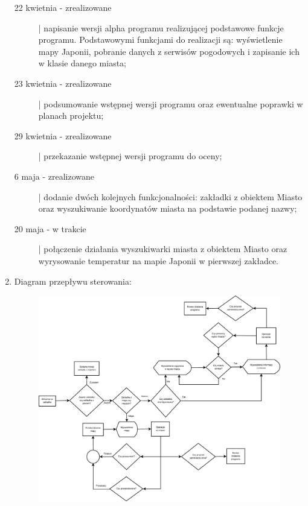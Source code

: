\documentclass[a4paper]{article}
\begin{document}
\begin{enumerate}
\begin{description}
\item[22 kwietnia - zrealizowane] | napisanie wersji alpha programu realizującej podstawowe funkcje programu. Podstawowymi funkcjami do realizacji są: wyświetlenie mapy Japonii, pobranie danych z serwisów pogodowych i zapisanie ich w klasie danego miasta;

\item[23 kwietnia - zrealizowane] | podsumowanie wstępnej wersji programu oraz ewentualne poprawki w planach projektu;

\item[29 kwietnia - zrealizowane] | przekazanie wstępnej wersji programu do oceny;

\item[6 maja - zrealizowane] | dodanie dwóch kolejnych funkcjonalności: zakładki z obiektem Miasto oraz wyszukiwanie koordynatów miasta na podstawie podanej nazwy;

\item[20 maja - w trakcie] | połączenie działania wyszukiwarki miasta z obiektem Miasto oraz wyrysowanie temperatur na mapie Japonii w pierwszej zakładce.
\end{description}

\pagebreak
\item Diagram przepływu sterowania:\\
\begin{figure}[H]
\includegraphics[width=15cm]{przeplyw.eps}
\end{figure}


\end{enumerate}
\end{document}
